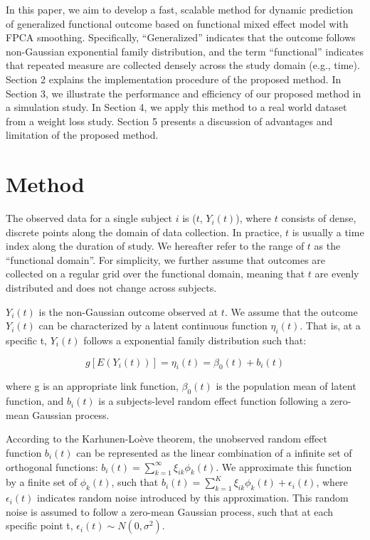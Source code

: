 \documentclass[
  11pt,
]{article}
\begin{document}
In this paper, we aim to develop a fast, scalable method for dynamic
prediction of generalized functional outcome based on functional mixed
effect model with FPCA smoothing. Specifically, ``Generalized''
indicates that the outcome follows non-Gaussian exponential family
distribution, and the term ``functional'' indicates that repeated
measure are collected densely across the study domain (e.g., time).
Section 2 explains the implementation procedure of the proposed method.
In Section 3, we illustrate the performance and efficiency of our
proposed method in a simulation study. In Section 4, we apply this
method to a real world dataset from a weight loss study. Section 5
presents a discussion of advantages and limitation of the proposed
method.

\hypertarget{method}{%
\section{Method}\label{method}}

The observed data for a single subject \(i\) is (\(t\), \(Y_i(t)\)),
where \(t\) consists of dense, discrete points along the domain of data
collection. In practice, \(t\) is usually a time index along the
duration of study. We hereafter refer to the range of \(t\) as the
``functional domain''. For simplicity, we further assume that outcomes
are collected on a regular grid over the functional domain, meaning that
\(t\) are evenly distributed and does not change across subjects.

\(Y_i(t)\) is the non-Gaussian outcome observed at \(t\). We assume that
the outcome \(Y_i(t)\) can be characterized by a latent continuous
function \(\eta_i(t)\). That is, at a specific t, \(Y_i(t)\) follows a
exponential family distribution such that:

\[
g[E(Y_i(t))] = \eta_i(t) = \beta_0(t)+b_i(t)
\]

where g is an appropriate link function, \(\beta_0(t)\) is the
population mean of latent function, and \(b_i(t)\) is a subjects-level
random effect function following a zero-mean Gaussian process.

According to the Karhunen-Loève theorem, the unobserved random effect
function \(b_i(t)\) can be represented as the linear combination of a
infinite set of orthogonal functions:
\(b_i(t)=\sum_{k=1}^{\infty}\xi_{ik}\phi_{k}(t)\). We approximate this
function by a finite set of \(\phi_{k}(t)\), such that
\(b_i(t)=\sum_{k=1}^{K}\xi_{ik}\phi_{k}(t)+\epsilon_i(t)\), where
\(\epsilon_i(t)\) indicates random noise introduced by this
approximation. This random noise is assumed to follow a zero-mean
Gaussian process, such that at each specific point t,
\(\epsilon_i(t) \sim N(0, \sigma^2)\).
\end{document}
